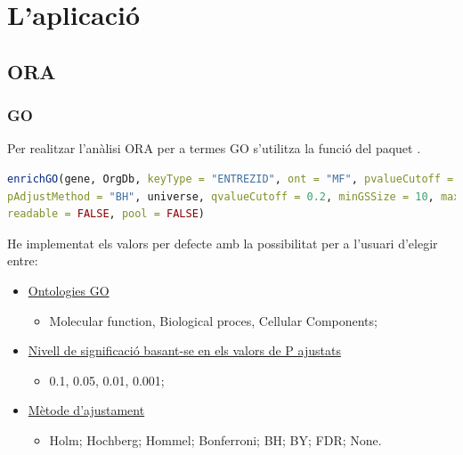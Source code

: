 \chapter{L'aplicació}
\label{sec:ACom}

\section{ORA}

\subsection{GO}

Per realitzar l'anàlisi ORA per a termes GO s'utilitza la funció  del paquet .
\begin{lstlisting}[language=R]
enrichGO(gene, OrgDb, keyType = "ENTREZID", ont = "MF", pvalueCutoff = 0.05, 
pAdjustMethod = "BH", universe, qvalueCutoff = 0.2, minGSSize = 10, maxGSSize = 500, 
readable = FALSE, pool = FALSE)
\end{lstlisting}

He implementat els valors per defecte amb la possibilitat per a l’usuari d'elegir entre:

\begin{itemize}
\item \underline{Ontologies GO} 
\begin{itemize}
\item Molecular function, Biological proces, Cellular Components;
\end{itemize}
\item \underline{Nivell de significació basant-se en els valors de P ajustats}
\begin{itemize}
\item 0.1, 0.05, 0.01, 0.001;
\end{itemize}
\item \underline{Mètode d'ajustament}
\begin{itemize}
\item Holm; Hochberg; Hommel; Bonferroni; BH; BY; FDR; None.
\end{itemize}
\end{itemize}

